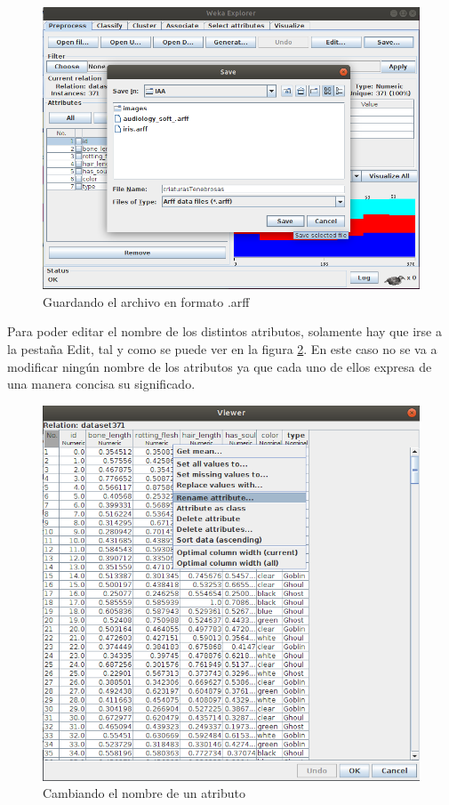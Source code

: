 \documentclass[11pt,twoside,a4paper]{book}
\begin{document}
\begin{figure}[H]
   \begin{center}
      \includegraphics[width=\textwidth]{ejercicio4_2.png}
   \end{center}
	\caption{Guardando el archivo en formato .arff}
	\label{Fig7}
\end{figure}

Para poder editar el nombre de los distintos atributos, solamente hay que irse a la
pestaña Edit, tal y como se puede ver en la figura \ref{Fig8}.
En este caso no se va a modificar ningún nombre de los atributos ya que cada uno
de ellos expresa de una manera concisa su significado.

\begin{figure}[H]
   \includegraphics[width=\textwidth]{ejercicio4_3.png}
	\caption{Cambiando el nombre de un atributo}
	\label{Fig8}
\end{figure}
\end{document}
